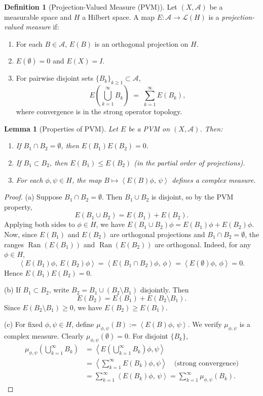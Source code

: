 \documentclass[11pt]{article}
\newtheorem{lemma}[theorem]{Lemma}
\theoremstyle{definition}
\newtheorem{definition}[theorem]{Definition}
\theoremstyle{remark}
\newcommand{\1}{\mathbbm{1}}
\newcommand{\ip}[2]{\left\langle #1,\,#2 \right\rangle}
\DeclareMathOperator{\Ran}{Ran}
\begin{document}
\begin{definition}[Projection-Valued Measure (PVM)]
Let $(X,\mathcal{A})$ be a measurable space and $H$ a Hilbert space. A map $E:\mathcal{A}\to\mathcal{L}(H)$ is a \emph{projection-valued measure} if:
\begin{enumerate}[label=(\roman*)]
\item For each $B\in\mathcal{A}$, $E(B)$ is an orthogonal projection on $H$.
\item $E(\emptyset)=0$ and $E(X)=I$.
\item For pairwise disjoint sets $\{B_k\}_{k\geq 1}\subset\mathcal{A}$,
\[
E\!\left(\bigcup_{k=1}^\infty B_k\right) \;=\; \sum_{k=1}^\infty E(B_k),
\]
where convergence is in the strong operator topology.
\end{enumerate}
\end{definition}

\begin{lemma}[Properties of PVM]\label{lem:pvm_properties}
Let $E$ be a PVM on $(X,\mathcal{A})$. Then:
\begin{enumerate}[label=(\alph*)]
\item If $B_1\cap B_2=\emptyset$, then $E(B_1)E(B_2)=0$.
\item If $B_1\subset B_2$, then $E(B_1)\leq E(B_2)$ (in the partial order of projections).
\item For each $\phi,\psi\in H$, the map $B\mapsto \ip{E(B)\phi}{\psi}$ defines a complex measure.
\end{enumerate}
\end{lemma}

\begin{proof}
(a) Suppose $B_1\cap B_2=\emptyset$. Then $B_1\cup B_2$ is disjoint, so by the PVM property,
\[
E(B_1\cup B_2)=E(B_1)+E(B_2).
\]
Applying both sides to $\phi\in H$, we have $E(B_1\cup B_2)\phi=E(B_1)\phi+E(B_2)\phi$. Now, since $E(B_1)$ and $E(B_2)$ are orthogonal projections and $B_1\cap B_2=\emptyset$, the ranges $\Ran(E(B_1))$ and $\Ran(E(B_2))$ are orthogonal. Indeed, for any $\phi\in H$,
\[
\ip{E(B_1)\phi}{E(B_2)\phi}=\ip{E(B_1\cap B_2)\phi}{\phi}=\ip{E(\emptyset)\phi}{\phi}=0.
\]
Hence $E(B_1)E(B_2)=0$.

(b) If $B_1\subset B_2$, write $B_2=B_1\cup(B_2\setminus B_1)$ disjointly. Then
\[
E(B_2)=E(B_1)+E(B_2\setminus B_1).
\]
Since $E(B_2\setminus B_1)\geq 0$, we have $E(B_2)\geq E(B_1)$.

(c) For fixed $\phi,\psi\in H$, define $\mu_{\phi,\psi}(B):=\ip{E(B)\phi}{\psi}$. We verify $\mu_{\phi,\psi}$ is a complex measure. Clearly $\mu_{\phi,\psi}(\emptyset)=0$. For disjoint $\{B_k\}$,
\begin{align*}
\mu_{\phi,\psi}\!\left(\bigcup_{k=1}^\infty B_k\right)
&=\left\langle E\!\left(\bigcup_{k=1}^\infty B_k\right)\phi,\psi\right\rangle\\
&=\left\langle \sum_{k=1}^\infty E(B_k)\phi,\psi\right\rangle \quad\text{(strong convergence)}\\
&=\sum_{k=1}^\infty\ip{E(B_k)\phi}{\psi}=\sum_{k=1}^\infty\mu_{\phi,\psi}(B_k).
\end{align*}
\end{proof}
\end{document}
